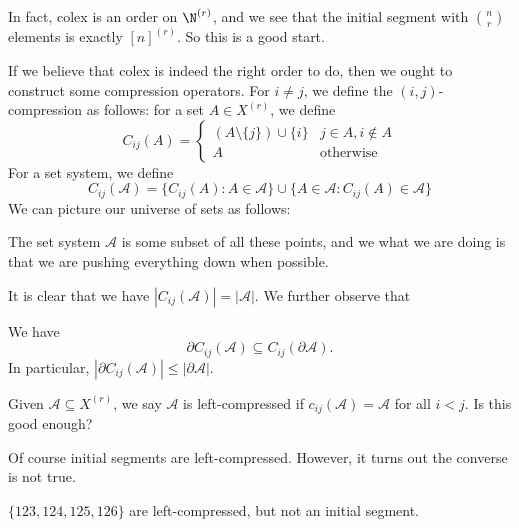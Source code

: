 \documentclass[a4paper]{article}
\begin{document}
In fact, colex is an order on $\N^{(r)}$, and we see that the initial segment with $\binom{n}{r}$ elements is exactly $[n]^{(r)}$. So this is a good start.

If we believe that colex is indeed the right order to do, then we ought to construct some compression operators. For $i \not= j$, we define the $(i, j)$-compression as follows: for a set $A \in X^{(r)}$, we define
\[
  C_{ij}(A) =
  \begin{cases}
    (A \setminus \{j\}) \cup \{i\} & j \in A, i \not\in A\\
    A & \text{otherwise}
  \end{cases}
\]
For a set system, we define
\[
  C_{ij}(\mathcal{A}) = \{C_{ij}(A): A \in \mathcal{A}\} \cup \{A \in \mathcal{A}:C_{ij}(A) \in \mathcal{A}\}
\]
We can picture our universe of sets as follows:
\begin{center}
\end{center}
The set system $\mathcal{A}$ is some subset of all these points, and we what we are doing is that we are pushing everything down when possible.

It is clear that we have $|C_{ij}(\mathcal{A})| = |\mathcal{A}|$. We further observe that

\begin{lemma}
  We have
  \[
    \partial C_{ij}(\mathcal{A}) \subseteq C_{ij}(\partial \mathcal{A}).
  \]
  In particular, $|\partial C_{ij}(\mathcal{A})| \leq |\partial \mathcal{A}|$.\qedsym
\end{lemma}

Given $\mathcal{A} \subseteq X^{(r)}$, we say $\mathcal{A}$ is left-compressed if $c_{ij}(\mathcal{A}) = \mathcal{A}$ for all $i < j$. Is this good enough?

Of course initial segments are left-compressed. However, it turns out the converse is not true.

\begin{eg}
  $\{123, 124, 125, 126\}$ are left-compressed, but not an initial segment.
\end{eg}
\end{document}
